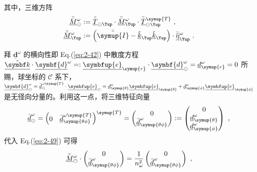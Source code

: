 其中，三维方阵
\begin{subequations} \label{eq:2-50}
	\begin{align}
		\bar{\bar{\underline{M}}}^{\omega}_{\circleddash} &:= \bar{\bar{\underline{T}}}_{\circleddash\Yup} \cdot \bar{\bar{\underline{M}}}^{\omega}_{\Yup} \cdot \bar{\bar{\underline{T}}}_{\circleddash\Yup}^{\symup{T}} \label{eq:2-50a}~,\\ \bar{\bar{\underline{M}}}^{\omega}_{\Yup} &:= \left( \bar{\bar{\symup{I}}} - \hat{\underline{k}}_{\Yup} \hat{\underline{k}}_{\Yup} \right) \cdot \bar{\bar{\underline{\eta}}}^{\omega}_{\Yup} \label{eq:2-50b}~.
	\end{align}
\end{subequations}

拜 $\underline{\symbf{d}}^{\omega}$ 的横向性即 Eq.(\ref{eq:2-42}) 中散度方程 $\hat{\underline{\symbf k}} \cdot \underline{\symbf{d}}^{\omega} =: \underline{\symbfup{e}}_{\symup{r}} \cdot \underline{\symbf{d}}^{\omega}_{\circleddash} = \underline{d}^{\omega}_{\symup{r}} = 0$ 所赐，球坐标的 $\mathcal{C}$ 系下， $\underline{\symbf{d}}^{\omega}_{\circleddash} = \bar{\underline{d}}_{\circleddash}^{\omega\symup{T}} \cdot \underline{\symbfup{e}}_{\circleddash} = \underline{d}^{\omega}_{\symup{\theta}} \underline{\symbfup{e}}_{\symup{\theta}} + \underline{d}^{\omega}_{\symup{\phi}} \underline{\symbfup{e}}_{\symup{\phi}}$ 是无径向分量的。利用这一点，将三维特征向量
\begin{equation} \label{eq:2-51}
	\bar{\underline{d}}^{\omega}_{\circleddash} = \begin{pmatrix} 0 & \bar{\underline{d}}^{\omega\symup{T}}_{\symup{\theta\phi}} \end{pmatrix}^{\symup{T}} = \begin{pmatrix} 0 \\ \bar{\underline{d}}^{\omega}_{\symup{\theta\phi}} \end{pmatrix} := \begin{pmatrix} 0 \\ \underline{d}^{\omega}_{\symup{\theta}} \\ \underline{d}^{\omega}_{\symup{\phi}} \end{pmatrix} ~,
\end{equation}
代入 Eq.(\ref{eq:2-49}) 可得
\begin{equation} \label{eq:2-52}
	\bar{\bar{\underline{M}}}^{\omega}_{\circleddash} \cdot \begin{pmatrix} 0 \\ \bar{\underline{d}}^{\omega}_{\symup{\theta\phi}} \end{pmatrix} = \frac{ 1 }{ n^2_\omega } \begin{pmatrix} 0 \\ \bar{\underline{d}}^{\omega}_{\symup{\theta\phi}} \end{pmatrix} ~,
\end{equation}
